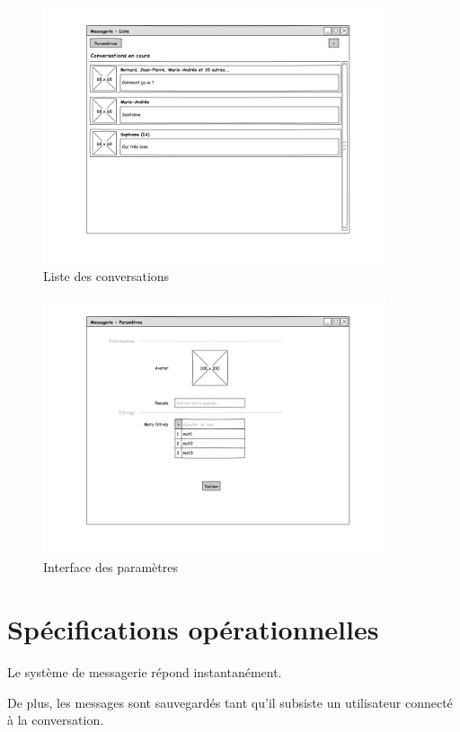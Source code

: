 \documentclass[11pt,dvipsnames,svgnames]{report}
\begin{document}
\begin{figure}[H]
\centerline{\includegraphics[width=0.9\textwidth]{maquette/maquette2.png}}
\caption{Liste des conversations}
\end{figure}

\begin{figure}[H]
\centerline{\includegraphics[width=0.9\textwidth]{maquette/maquette3.png}}
\caption{Interface des paramètres}
\end{figure}


\section{Spécifications opérationnelles}

Le système de messagerie répond instantanément.

De plus, les messages sont sauvegardés tant qu'il subsiste un utilisateur connecté à la conversation.
\end{document}
